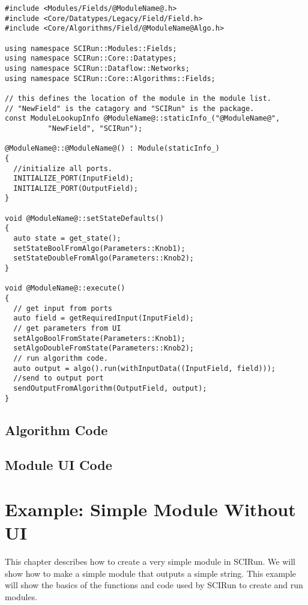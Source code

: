 \documentclass[fleqn,11pt,openany]{book}
\begin{document}
\begin{verbatim}
#include <Modules/Fields/@ModuleName@.h>
#include <Core/Datatypes/Legacy/Field/Field.h>
#include <Core/Algorithms/Field/@ModuleName@Algo.h>

using namespace SCIRun::Modules::Fields;
using namespace SCIRun::Core::Datatypes;
using namespace SCIRun::Dataflow::Networks;
using namespace SCIRun::Core::Algorithms::Fields;

// this defines the location of the module in the module list.  
// "NewField" is the catagory and "SCIRun" is the package.
const ModuleLookupInfo @ModuleName@::staticInfo_("@ModuleName@", 
          "NewField", "SCIRun");

@ModuleName@::@ModuleName@() : Module(staticInfo_)
{
  //initialize all ports.
  INITIALIZE_PORT(InputField);
  INITIALIZE_PORT(OutputField);
}

void @ModuleName@::setStateDefaults()
{
  auto state = get_state();
  setStateBoolFromAlgo(Parameters::Knob1);
  setStateDoubleFromAlgo(Parameters::Knob2);
}

void @ModuleName@::execute()
{
  // get input from ports
  auto field = getRequiredInput(InputField);
  // get parameters from UI
  setAlgoBoolFromState(Parameters::Knob1);
  setAlgoDoubleFromState(Parameters::Knob2);
  // run algorithm code.  
  auto output = algo().run(withInputData((InputField, field)));
  //send to output port
  sendOutputFromAlgorithm(OutputField, output);
}
\end{verbatim}


\section{Algorithm Code}
\label{sec:algo}


\section{Module UI Code}
\label{sec:ui}

\chapter{Example: Simple Module Without UI}

\begin{introduction}
This chapter describes how to create a very simple module in SCIRun.  
We will show how to make a simple module that outputs a simple string.  
This example will show the basics of the functions and code used by SCIRun to create and run modules.

\end{introduction}
\end{document}
